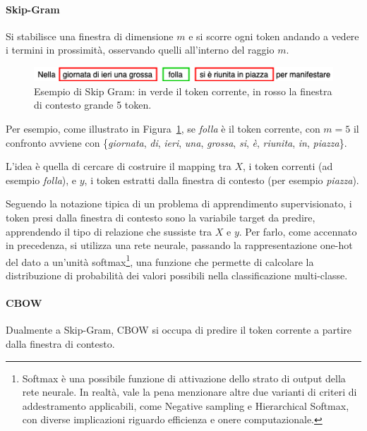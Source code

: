 \documentclass[12pt]{report}
\theoremstyle{definition}
\begin{document}
\paragraph{Skip-Gram}
Si stabilisce una finestra di dimensione $m$ e si scorre ogni token andando a vedere i termini in prossimità, osservando quelli all'interno del raggio $m$.
\begin{figure}
    \centering
    \includegraphics[scale = 0.7]{images/skip-gram.png}
    \caption{Esempio di Skip Gram: in verde il token corrente, in rosso la finestra di contesto grande 5 token.}
    \label{skipgram}
\end{figure}
Per esempio, come illustrato in Figura~\ref{skipgram}, se \textit{folla} è il token corrente, con $m = 5$ il confronto avviene con \{\textit{giornata}, \textit{di}, \textit{ieri}, \textit{una}, \textit{grossa}, \textit{si}, \textit{è}, \textit{riunita}, \textit{in}, \textit{piazza}\}.

L'idea è quella di cercare di costruire il mapping tra $X$, i token correnti (ad esempio \textit{folla}), e $y$, i token estratti dalla finestra di contesto (per esempio \textit{piazza}).

Seguendo la notazione tipica di un problema di apprendimento supervisionato, i token presi dalla finestra di contesto sono la variabile target da predire, apprendendo il tipo di relazione che sussiste tra  $X$ e $y$.
Per farlo, come accennato in precedenza, si utilizza una rete neurale, passando la rappresentazione one-hot del dato a un'unità softmax\footnote{Softmax è una possibile funzione di attivazione dello strato di output della rete neurale. In realtà, vale la pena menzionare altre due varianti di criteri di addestramento applicabili, come Negative sampling e Hierarchical Softmax, con diverse implicazioni riguardo efficienza e onere computazionale.}, una funzione che permette di calcolare la distribuzione di probabilità dei valori possibili nella classificazione multi-classe.

\paragraph{CBOW}
Dualmente a Skip-Gram, CBOW si occupa di predire il token corrente a partire dalla finestra di contesto.
\end{document}
